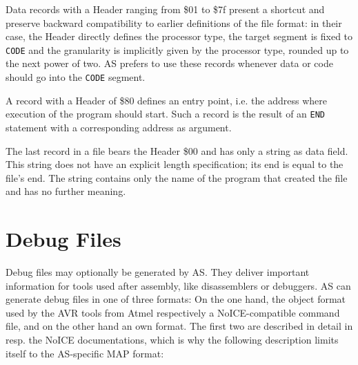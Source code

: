 \documentclass[12pt,twoside]{report}
\newcommand{\tty}[1]{{\tt #1}}
\newcommand{\asname}{{AS}}
\begin{document}
Data records with a Header ranging from \$01 to \$7f present a shortcut
and preserve backward compatibility to earlier definitions of the
file format: in their case, the Header directly defines the processor
type, the target segment is fixed to \tty{CODE} and the granularity is
implicitly given by the processor type, rounded up to the next power
of two.  \asname{} prefers to use these records whenever data or code should
go into the \tty{CODE} segment.

A record with a Header of \$80 defines an entry point, i.e. the
address where execution of the program should start.  Such a record
is the result of an \tty{END} statement with a corresponding address as
argument.

The last record in a file bears the Header \$00 and has only a string
as data field.  This string does not have an explicit length
specification; its end is equal to the file's end.  The string
contains only the name of the program that created the file and has
no further meaning.


\section{Debug Files}
\label{SectDebugFormat}

Debug files may optionally be generated by \asname{}.  They deliver important
information for tools used after assembly, like disassemblers or
debuggers.  \asname{} can generate debug files in one of three formats: On the
one hand, the object format used by the AVR tools from Atmel respectively
a NoICE-compatible command file, and on the other hand an own format.  The
first two are described in detail in \cite{AVRObj} resp. the NoICE
documentations, which is why the following description limits itself to
the \asname{}-specific MAP format:
\end{document}
